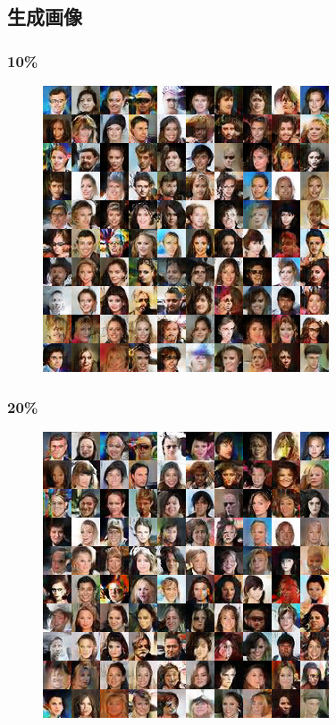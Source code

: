 \documentclass[dvipdfmx,12pt]{beamer}
\begin{document}
\subsection{生成画像}
\begin{frame}
	\frametitle{10\%}
	\begin{figure}[htbp]
	\begin{center}
	\includegraphics[width=0.7\hsize]{./sndcgan/image00010000.png}
	\end{center}
	\end{figure}
\end{frame}
\begin{frame}
	\frametitle{20\%}
	\begin{figure}[htbp]
	\begin{center}
	\includegraphics[width=0.7\hsize]{./sndcgan/image00020000.png}
	\end{center}
	\end{figure}
\end{frame}
\end{document}
